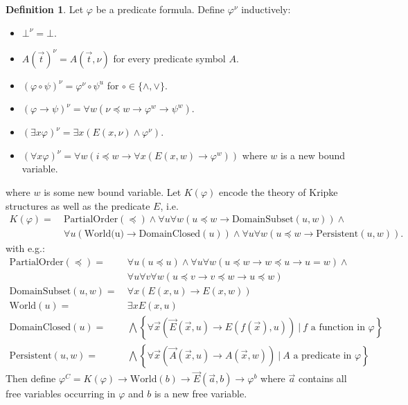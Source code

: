 \documentclass{easychair}
\theoremstyle{definition}
\theoremstyle{definition}
\theoremstyle{definition}
\theoremstyle{definition}
\theoremstyle{definition}
\newtheorem{definition}[theorem]{Definition}
\theoremstyle{definition}
\theoremstyle{definition}
\begin{document}
\begin{definition}\label{def:fo-translation}
	Let $\varphi$ be a predicate formula. Define $\varphi^{\nu}$ inductively:
	\begin{itemize}
		\item $\bot^\nu = \bot$.
		\item $A(\vec t)^{\nu} = A(\vec t, \nu)$ for every predicate symbol $A$.
		\item $(\varphi\circ\psi)^\nu = \varphi^\nu\circ\psi^u$ for $\circ\in\{\wedge, \vee\}$.
		\item $(\varphi\to \psi)^\nu = \forall w(\nu\preceq w\to\varphi^{w}\to\psi^{w})$.
		\item $(\exists x\varphi)^\nu = \exists x(E(x,\nu)\wedge\varphi^\nu)$.
		\item $(\forall x\varphi)^\nu = \forall w(i\preceq w\to \forall x(E(x, w)\to \varphi^w))$ where $w$ is a new bound variable.
	\end{itemize}
	where $w$ is some new bound variable. Let $K(\varphi)$ encode the theory of Kripke structures as well as the predicate $E$, i.e.
	\begin{align*}
		K(\varphi) = \:& \text{PartialOrder}(\preceq) \wedge \forall u \forall w (u\preceq w\to \text{DomainSubset}(u, w)) \wedge\\
		& \forall u(\text{World(u)}\to \text{DomainClosed}(u))\wedge \forall u\forall w (u\preceq w\to \text{Persistent}(u, w)).
	\end{align*}
	with e.g.:\vspace*{-.76cm}
	\begin{align*}
		\text{PartialOrder}(\preceq) = &\:\forall u(u\preceq u)\wedge\forall u\forall w(u\preceq w\to w\preceq u\to u = w)\wedge\\&\:\forall u\forall v\forall w(u\preceq v\to v\preceq w\to u\preceq w)\\
		\text{DomainSubset}(u, w) = &\:\forall x(E(x, u)\to E(x, w))\\
		\text{World}(u) = &\:\exists xE(x, u)\\
		\text{DomainClosed}(u) = &\:\bigwedge\left\{\forall\vec x(\vec E(\vec x, u)\to E(f(\vec x), u))\:|\:\text{$f$ a function in $\varphi$}\right\}\\
		\text{Persistent}(u, w) = &\:\bigwedge\left\{\forall\vec x(\vec A(\vec x, u)\to A(\vec x, w))\:|\:\text{$A$ a predicate in $\varphi$}\right\}
	\end{align*}
	Then define
	$\varphi^C = K(\varphi)\to\text{World}(b)\to \vec E(\vec a, b)\to \varphi^b$ where $\vec a$ contains all free variables occurring in $\varphi$ and $b$ is a new free variable.
\end{definition}
\end{document}
